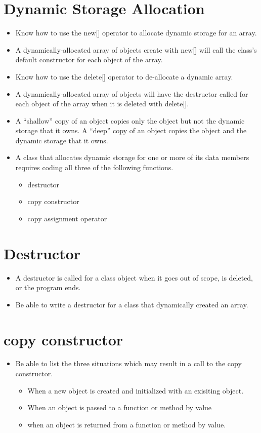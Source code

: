 \documentclass{report}
\begin{document}
    \section{Dynamic Storage Allocation}
    \begin{itemize}
      \item Know how to use the new[] operator to allocate dynamic storage for an array.
      \item A dynamically-allocated array of objects create with new[] will call the class's default constructor for each object of the array.
      \item Know how to use the delete[] operator to de-allocate a dynamic array.
      \item A dynamically-allocated array of objects will have the destructor called for each object of the array when it is deleted with delete[].
      \item A ``shallow'' copy of an object copies only the object but not the dynamic storage that it owns. A ``deep'' copy of an object copies the object and the dynamic storage that it owns.
      \item A class that allocates dynamic storage for one or more of its data members requires coding all three of the following functions.
        \begin{itemize}[label=$\circ$]
          \item destructor
          \item copy constructor
          \item copy assignment operator
        \end{itemize}
  \end{itemize}
  \section{Destructor}
  \begin{itemize}
    \item A destructor is called for a class object when it goes out of scope, is deleted, or the program ends.
    \item Be able to write a destructor for a class that dynamically created an array.
  \end{itemize}
  \section{copy constructor}
  \begin{itemize}
    \item Be able to list the three situations which may result in a call to the copy constructor.
      \begin{itemize}[label=$\circ$]
        \item When a new object is created and initialized with an exisiting object.
        \item When an object is passed to a function or method by value
        \item when an object is returned from a function or method by value.
      \end{itemize}
  \end{itemize}
\end{document}
